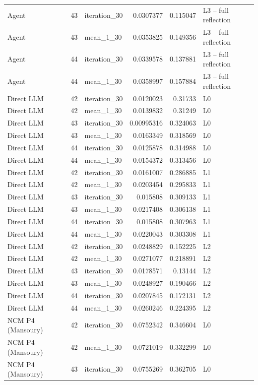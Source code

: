 \begin{table}[htbp!]
\begin{tabular}{lrlrrl}
Agent & 43 & iteration\_30 & 0.0307377 & 0.115047 & L3 -- full reflection \\
Agent & 43 & mean\_1\_30 & 0.0353825 & 0.149356 & L3 -- full reflection \\
Agent & 44 & iteration\_30 & 0.0339578 & 0.137881 & L3 -- full reflection \\
Agent & 44 & mean\_1\_30 & 0.0358997 & 0.157884 & L3 -- full reflection \\
Direct LLM & 42 & iteration\_30 & 0.0120023 & 0.31733 & L0 \\
Direct LLM & 42 & mean\_1\_30 & 0.0139832 & 0.31249 & L0 \\
Direct LLM & 43 & iteration\_30 & 0.00995316 & 0.324063 & L0 \\
Direct LLM & 43 & mean\_1\_30 & 0.0163349 & 0.318569 & L0 \\
Direct LLM & 44 & iteration\_30 & 0.0125878 & 0.314988 & L0 \\
Direct LLM & 44 & mean\_1\_30 & 0.0154372 & 0.313456 & L0 \\
Direct LLM & 42 & iteration\_30 & 0.0161007 & 0.286885 & L1 \\
Direct LLM & 42 & mean\_1\_30 & 0.0203454 & 0.295833 & L1 \\
Direct LLM & 43 & iteration\_30 & 0.015808 & 0.309133 & L1 \\
Direct LLM & 43 & mean\_1\_30 & 0.0217408 & 0.306138 & L1 \\
Direct LLM & 44 & iteration\_30 & 0.015808 & 0.307963 & L1 \\
Direct LLM & 44 & mean\_1\_30 & 0.0220043 & 0.303308 & L1 \\
Direct LLM & 42 & iteration\_30 & 0.0248829 & 0.152225 & L2 \\
Direct LLM & 42 & mean\_1\_30 & 0.0271077 & 0.218891 & L2 \\
Direct LLM & 43 & iteration\_30 & 0.0178571 & 0.13144 & L2 \\
Direct LLM & 43 & mean\_1\_30 & 0.0248927 & 0.190466 & L2 \\
Direct LLM & 44 & iteration\_30 & 0.0207845 & 0.172131 & L2 \\
Direct LLM & 44 & mean\_1\_30 & 0.0260246 & 0.224395 & L2 \\
NCM P4 (Mansoury) & 42 & iteration\_30 & 0.0752342 & 0.346604 & L0 \\
NCM P4 (Mansoury) & 42 & mean\_1\_30 & 0.0721019 & 0.332299 & L0 \\
NCM P4 (Mansoury) & 43 & iteration\_30 & 0.0755269 & 0.362705 & L0 \\

\end{tabular}
\end{table}
